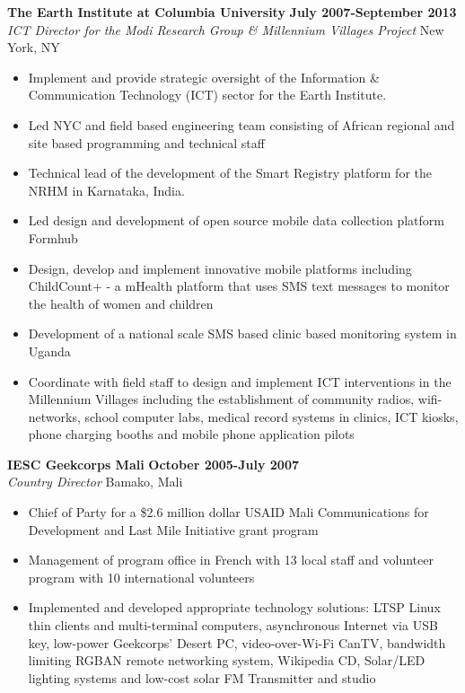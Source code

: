 \documentclass{res}
\begin{document}
\begin{resume}
\vspace{8pt}
\textbf{The Earth Institute at Columbia University} \hfill        \textbf{July 2007-September 2013} \\
\emph{ICT Director for the Modi Research Group \& Millennium Villages Project}       \hfill   New York, NY

\begin{itemize} \itemsep -2pt %
        \item Implement and provide strategic oversight of the Information \& Communication Technology (ICT) sector for the Earth Institute.
	\item Led NYC and field based engineering team consisting of African regional and site based programming and technical staff
	\item Technical lead of the development of the Smart Registry platform for the NRHM in Karnataka, India.
        \item Led design and development of open source mobile data collection platform Formhub
	\item Design, develop and implement innovative mobile platforms including ChildCount+ - a mHealth platform that uses SMS text messages to monitor the health of women and children
	\item Development of a national scale SMS based clinic based monitoring system in Uganda
	\item Coordinate with field staff to design and implement ICT interventions in the Millennium Villages including the establishment of community radios, wifi-networks, school computer labs, medical record systems in clinics, ICT kiosks, phone charging booths and mobile phone application pilots
 \end{itemize} \vspace{-4pt}

\textbf{IESC Geekcorps Mali} \hfill        \textbf{October 2005-July 2007} \\
\emph{Country Director}       \hfill   Bamako, Mali
   \begin{itemize} \itemsep -2pt %
	\item Chief of Party for a \$2.6 million dollar USAID Mali Communications for Development and Last Mile Initiative grant program 
	\item Management of program office in French with 13 local staff and volunteer program with 10 international volunteers 
	\item Implemented and developed appropriate technology solutions: LTSP Linux thin clients and multi-terminal computers, 
asynchronous Internet via USB key, low-power Geekcorps’ Desert PC, video-over-Wi-Fi CanTV, bandwidth limiting RGBAN 
remote networking system, Wikipedia CD, Solar/LED lighting systems and low-cost solar FM Transmitter and studio
 \end{itemize} \vspace{-4pt}


\end{resume}
\end{document}
